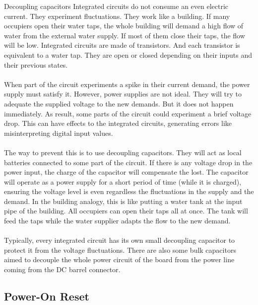 \begin{theory}[htb]{Decoupling capacitors}
  Integrated circuits do not consume an even electric current. They experiment fluctuations. They work like a building. If many occupiers open their water taps, the whole building will demand a high flow of water from the external water supply. If most of them close their taps, the flow will be low. Integrated circuits are made of transistors. And each transistor is equivalent to a water tap. They are open or closed depending on their inputs and their previous states.\\\\

  When part of the circuit experiments a spike in their current demand, the power supply must satisfy it. However, power supplies are not ideal. They will try to adequate the supplied voltage to the new demands. But it does not happen immediately. As result, some parts of the circuit could experiment a brief voltage drop. This can have effects to the integrated circuits, generating errors like misinterpreting digital input values.\\\\

  The way to prevent this is to use decoupling capacitors. They will act as local batteries connected to some part of the circuit. If there is any voltage drop in the power input, the charge of the capacitor will compensate the lost. The capacitor will operate as a power supply for a short period of time (while it is charged), ensuring the voltage level is even regardless the fluctuations in the supply and the demand. In the building analogy, this is like putting a water tank at the input pipe of the building. All occupiers can open their taps all at once. The tank will feed the taps while the water supplier adapts the flow to the new demand.\\\\

  Typically, every integrated circuit has its own small decoupling capacitor to protect it from the voltage fluctuations. There are also some bulk capacitors aimed to decouple the whole power circuit of the board from the power line coming from the DC barrel connector.
\end{theory}

\subsection{Power-On Reset}

